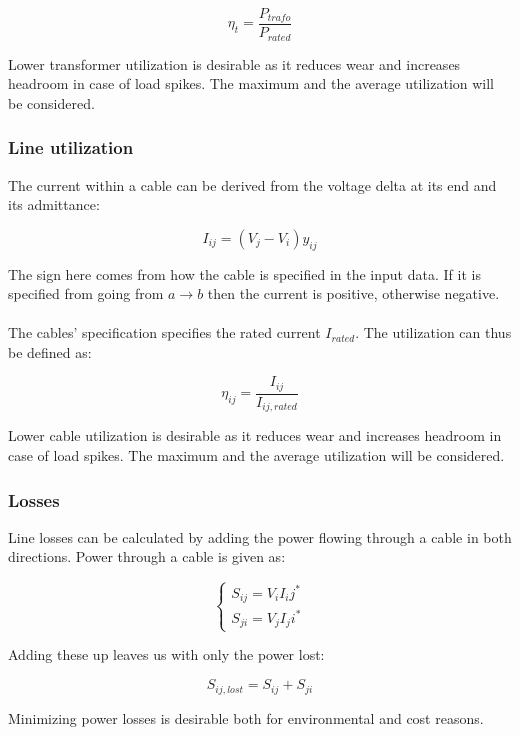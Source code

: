 \begin{equation}
  \eta_t = \frac{P_{trafo}}{P_{rated}}
\end{equation}

Lower transformer utilization is desirable as it reduces wear and increases
headroom in case of load spikes. The maximum and the average utilization
will be considered.

\subsubsection{Line utilization}

The current within a cable can be derived from the voltage delta at its
end and its admittance:

\begin{equation}
  I_{ij} = (V_j - V_i)y_{ij}
\end{equation}

The sign here comes from how the cable is specified in the input data. If it is
specified from going from $a \to b$ then the current is positive, otherwise negative.\\
\\
The cables' specification specifies the rated current $I_{rated}$. The utilization
can thus be defined as:

\begin{equation}
  \eta_{ij} = \frac{I_{ij}}{I_{ij, rated}}
\end{equation}

Lower cable utilization is desirable as it reduces wear and increases
headroom in case of load spikes. The maximum and the average utilization
will be considered.

\subsubsection{Losses}

Line losses can be calculated by adding the power flowing through
a cable in both directions. Power through a cable is given as:

\begin{equation}
  \begin{cases}
  S_{ij} = V_i I_ij^*\\
  S_{ji} = V_j I_ji^*
  \end{cases}
\end{equation}

Adding these up leaves us with only the power lost:

\begin{equation}
S_{ij, lost} = S_{ij} + S_{ji}
\end{equation}

Minimizing power losses is desirable both for environmental and cost reasons.